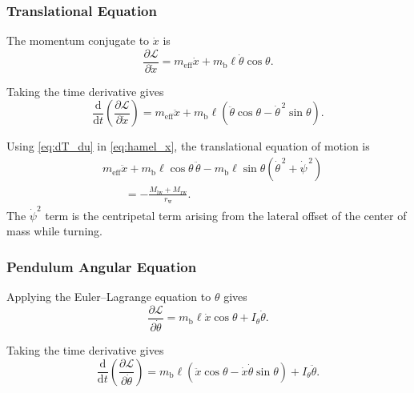 \documentclass[journal]{IEEEtran}
\begin{document}
\subsubsection{Translational Equation}

The momentum conjugate to $\dot x$ is
\begin{equation}
    \frac{\partial \mathcal{L}}
    {\partial \dot{x}}
    =
    m_{\mathrm{eff}}
    \dot{x}
    +
    m_{\mathrm b}\ell
    \dot{\theta}\cos\theta.
    \label{eq:partial_L_partial_xdot}
\end{equation}

Taking the time derivative gives
\begin{equation}
    \frac{\mathrm{d}}{\mathrm{d}t}
    \left(
        \frac{\partial \mathcal{L}}
        {\partial \dot{x}}
    \right)
    =
    m_{\mathrm{eff}}
    \ddot{x}
    +
    m_{\mathrm b}\ell
    \left(
        \ddot{\theta}\cos\theta
        -
        \dot{\theta}^{\,2}\sin\theta
    \right).
    \label{eq:d_dt_partial_L_partial_xdot}
\end{equation}

Using \eqref{eq:dT_du} in \eqref{eq:hamel_x}, the translational equation of
motion is
\begin{align}
    &m_{\mathrm{eff}}
    \ddot{x}
    +
    m_{\mathrm b}\ell
    \cos\theta\,\ddot{\theta}
    -
    m_{\mathrm b}\ell
    \sin\theta
    \left(
        \dot{\theta}^{\,2}
        +
        \dot{\psi}^{\,2}
    \right)
    \nonumber\\
    &\qquad
    =
    -\frac{M_{\mathrm{lw}}+M_{\mathrm{rw}}}{r_{\mathrm w}}.
    \label{eq:translation_eom}
\end{align}
The $\dot\psi^2$ term is the centripetal term arising from the lateral offset
of the center of mass while turning.

\subsubsection{Pendulum Angular Equation}

Applying the Euler--Lagrange equation to $\theta$ gives
\begin{equation}
    \frac{\partial \mathcal{L}}
    {\partial \dot{\theta}}
    =
    m_{\mathrm b}\ell
    \dot{x}\cos\theta
    +
    I_{\theta}
    \dot{\theta}.
    \label{eq:partial_L_partial_thetadot}
\end{equation}

Taking the time derivative gives
\begin{equation}
    \frac{\mathrm{d}}{\mathrm{d}t}
    \left(
        \frac{\partial \mathcal{L}}
        {\partial \dot{\theta}}
    \right)
    =
    m_{\mathrm b}\ell
    \left(
        \ddot{x}\cos\theta
        -
        \dot{x}\dot{\theta}\sin\theta
    \right)
    +
    I_{\theta}
    \ddot{\theta}.
    \label{eq:d_dt_partial_L_partial_thetadot}
\end{equation}
\end{document}

